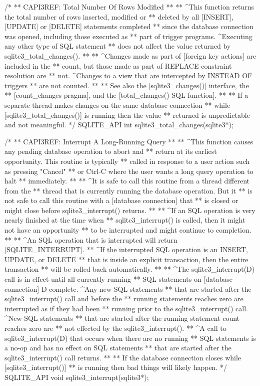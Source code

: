\begin{Codex}[label=sqlite3.h,numbers=left]
{/*
** CAPI3REF: Total Number Of Rows Modified
**
** ^This function returns the total number of rows inserted, modified or
** deleted by all [INSERT], [UPDATE] or [DELETE] statements completed
** since the database connection was opened, including those executed as
** part of trigger programs. ^Executing any other type of SQL statement
** does not affect the value returned by sqlite3_total_changes().
** 
** ^Changes made as part of [foreign key actions] are included in the
** count, but those made as part of REPLACE constraint resolution are
** not. ^Changes to a view that are intercepted by INSTEAD OF triggers 
** are not counted.
** 
** See also the [sqlite3_changes()] interface, the
** [count_changes pragma], and the [total_changes() SQL function].
**
** If a separate thread makes changes on the same database connection
** while [sqlite3_total_changes()] is running then the value
** returned is unpredictable and not meaningful.
*/
SQLITE_API int sqlite3_total_changes(sqlite3*);

/*
** CAPI3REF: Interrupt A Long-Running Query
**
** ^This function causes any pending database operation to abort and
** return at its earliest opportunity. This routine is typically
** called in response to a user action such as pressing "Cancel"
** or Ctrl-C where the user wants a long query operation to halt
** immediately.
**
** ^It is safe to call this routine from a thread different from the
** thread that is currently running the database operation.  But it
** is not safe to call this routine with a [database connection] that
** is closed or might close before sqlite3_interrupt() returns.
**
** ^If an SQL operation is very nearly finished at the time when
** sqlite3_interrupt() is called, then it might not have an opportunity
** to be interrupted and might continue to completion.
**
** ^An SQL operation that is interrupted will return [SQLITE_INTERRUPT].
** ^If the interrupted SQL operation is an INSERT, UPDATE, or DELETE
** that is inside an explicit transaction, then the entire transaction
** will be rolled back automatically.
**
** ^The sqlite3_interrupt(D) call is in effect until all currently running
** SQL statements on [database connection] D complete.  ^Any new SQL statements
** that are started after the sqlite3_interrupt() call and before the 
** running statements reaches zero are interrupted as if they had been
** running prior to the sqlite3_interrupt() call.  ^New SQL statements
** that are started after the running statement count reaches zero are
** not effected by the sqlite3_interrupt().
** ^A call to sqlite3_interrupt(D) that occurs when there are no running
** SQL statements is a no-op and has no effect on SQL statements
** that are started after the sqlite3_interrupt() call returns.
**
** If the database connection closes while [sqlite3_interrupt()]
** is running then bad things will likely happen.
*/
SQLITE_API void sqlite3_interrupt(sqlite3*);

}
\end{Codex}
